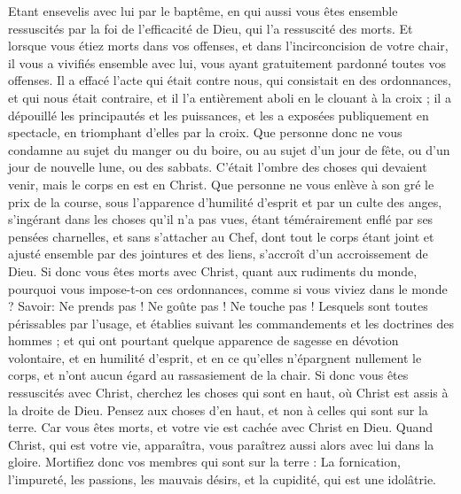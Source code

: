 \begin{multicols}{2}
Etant ensevelis avec lui par le baptême, en qui aussi vous êtes ensemble ressuscités par la foi de l'efficacité de Dieu, qui l'a ressuscité des morts.
Et lorsque vous étiez morts dans vos offenses, et dans l'incirconcision de votre chair, il vous a vivifiés ensemble avec lui, vous ayant gratuitement pardonné toutes vos offenses.
Il a effacé l'acte qui était contre nous, qui consistait en des ordonnances, et qui nous était contraire, et il l'a entièrement aboli en le clouant à la croix ;
il a dépouillé les principautés et les puissances, et les a exposées publiquement en spectacle, en triomphant d'elles par la croix.
Que personne donc ne vous condamne au sujet du manger ou du boire, ou au sujet d'un jour de fête, ou d'un jour de nouvelle lune, ou des sabbats.
C'était l'ombre des choses qui devaient venir, mais le corps en est en Christ.
Que personne ne vous enlève à son gré le prix de la course, sous l'apparence d'humilité d'esprit et par un culte des anges, s'ingérant dans les choses qu'il n'a pas vues, étant témérairement enflé par ses pensées charnelles,
et sans s'attacher au Chef, dont tout le corps étant joint et ajusté ensemble par des jointures et des liens, s'accroît d'un accroissement de Dieu.
Si donc vous êtes morts avec Christ, quant aux rudiments du monde, pourquoi vous impose-t-on ces ordonnances, comme si vous viviez dans le monde ?
Savoir: Ne prends pas ! Ne goûte pas ! Ne touche pas !
Lesquels sont toutes périssables par l'usage, et établies suivant les commandements et les doctrines des hommes ; 
et qui ont pourtant quelque apparence de sagesse en dévotion volontaire, et en humilité d'esprit, et en ce qu'elles n'épargnent nullement le corps, et n'ont aucun égard au rassasiement de la chair.
\VerseOne{}Si donc vous êtes ressuscités avec Christ, cherchez les choses qui sont en haut, où Christ est assis à la droite de Dieu.
Pensez aux choses d'en haut, et non à celles qui sont sur la terre.
Car vous êtes morts, et votre vie est cachée avec Christ en Dieu.
Quand Christ, qui est votre vie, apparaîtra, vous paraîtrez aussi alors avec lui dans la gloire.
Mortifiez donc vos membres qui sont sur la terre : La fornication, l'impureté, les passions, les mauvais désirs, et la cupidité, qui est une idolâtrie.

\end{multicols}
